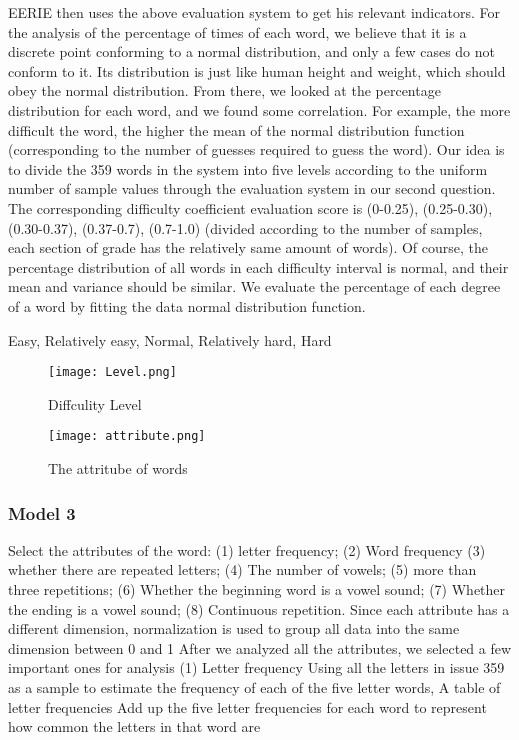 \documentclass[12pt]{article}  %
\begin{document}
\clearpage

EERIE then uses the above evaluation system to get his relevant indicators.
For the analysis of the percentage of times of each word, we believe that it is a discrete point conforming to a normal distribution, and only a few cases do not conform to it. Its distribution is just like human height and weight, which should obey the normal distribution.
From there, we looked at the percentage distribution for each word, and we found some correlation. For example, the more difficult the word, the higher the mean of the normal distribution function (corresponding to the number of guesses required to guess the word).
Our idea is to divide the 359 words in the system into five levels according to the uniform number of sample values through the evaluation system in our second question. The corresponding difficulty coefficient evaluation score is (0-0.25), (0.25-0.30), (0.30-0.37), (0.37-0.7), (0.7-1.0) (divided according to the number of samples, each section of grade has the relatively same amount of words). Of course, the percentage distribution of all words in each difficulty interval is normal, and their mean and variance should be similar.
We evaluate the percentage of each degree of a word by fitting the data normal distribution function.


Easy, Relatively easy, Normal, Relatively hard, Hard

\begin{figure}[htbp]
	\centering
\texttt{[image: Level.png]}
\caption{Diffculity Level}\label{fig:result}
\end{figure}









\begin{figure}[htbp]
    \texttt{[image: attribute.png]}
	\caption{ The attritube of words}\label{fig:result}
\end{figure}


\clearpage
\subsubsection{Model 3}



Select the attributes of the word: (1) letter frequency; (2) Word frequency (3) whether there are repeated letters; (4) The number of vowels; (5) more than three repetitions; (6) Whether the beginning word is a vowel sound; (7) Whether the ending is a vowel sound; (8) Continuous repetition.
Since each attribute has a different dimension, normalization is used to group all data into the same dimension between 0 and 1
After we analyzed all the attributes, we selected a few important ones for analysis
(1) Letter frequency
Using all the letters in issue 359 as a sample to estimate the frequency of each of the five letter words,
A table of letter frequencies
Add up the five letter frequencies for each word to represent how common the letters in that word are
\end{document}
